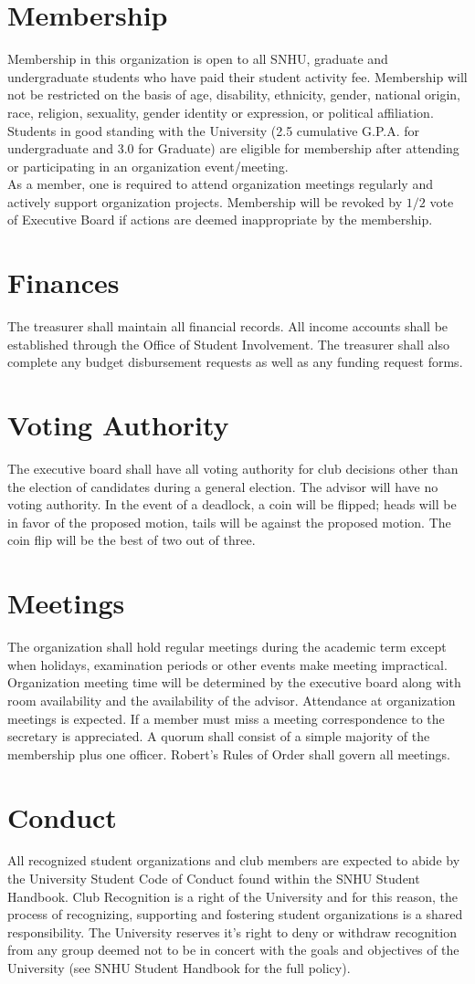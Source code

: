 \documentclass{article}
\newcommand{\article}[1]{\section{#1} \label{#1}}
\begin{document}
\article{Membership}
Membership in this organization is open to all SNHU, graduate and undergraduate students who have paid their student activity fee. 
Membership will not be restricted on the basis of age, disability, ethnicity, gender, national origin, race, religion, sexuality, gender identity or expression, or political affiliation. 
Students in good standing with the University (2.5 cumulative  G.P.A. for undergraduate and 3.0 for Graduate) are eligible for membership after attending or participating in an organization event/meeting.\\

As a member, one is required to attend organization meetings regularly and actively support organization projects. 
Membership will be revoked by $1/2$ vote of Executive Board if actions are deemed inappropriate by the membership.

\article{Finances}
The treasurer shall maintain all financial records. 
All income accounts shall be established through the Office of Student Involvement. 
The treasurer shall also complete any budget disbursement requests as well as any funding request forms.

\article{Voting Authority}
The executive board shall have all voting authority for club decisions other than the election of candidates during a general election. 
The advisor will have no voting authority. 
In the event of a deadlock, a coin will be flipped; heads will be in favor of the proposed motion, tails will be against the proposed motion. 
The coin flip will be the best of two out of three.

\article{Meetings}
The organization shall hold regular meetings during the academic term except when holidays, examination periods or other events make meeting impractical. 
Organization meeting time will be determined by the executive board along with room availability and the availability of the advisor. 
Attendance at organization meetings is expected. 
If a member must miss a meeting correspondence to the secretary is appreciated. 
A quorum shall consist of a simple majority of the membership plus one officer. 
Robert's Rules of Order shall govern all meetings.

\article{Conduct}
All recognized student organizations and club members are expected to abide by the University Student Code of Conduct found within the SNHU Student Handbook. 
Club Recognition is a right of the University and for this reason, the process of recognizing, supporting and fostering student organizations is a shared responsibility. 
The University reserves it's right to deny or withdraw recognition from any group deemed not to be in concert with the goals and objectives of the University (see SNHU Student Handbook for the full policy).
\end{document}

